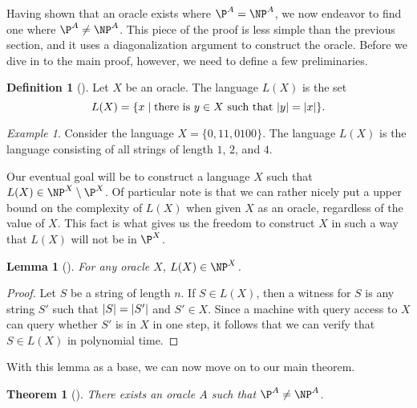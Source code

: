 \documentclass[english,12pt]{reedthesis}
\theoremstyle{plain}
\newtheorem{thm}{Theorem}[section]
\newtheorem{lemma}[lemma]{Lemma}
\theoremstyle{definition}
\newtheorem{defn}[defn]{Definition}
\theoremstyle{remark}
\newtheorem{example}{Example}[thm]
\DeclarePairedDelimiter{\abs}{\lvert}{\rvert}
\begin{document}
Having shown that an oracle exists where $\P^{A} = \NP^{A}$, we now endeavor to
find one where $\P^{A} \ne \NP^{A}$. This piece of the proof is less simple than
the previous section, and it uses a diagonalization argument to construct the
oracle. Before we dive in to the main proof, however, we need to define a few
preliminaries.

\begin{defn}[{\cite[436]{BGS75}}]\label{def:l(x)}
  Let $X$ be an oracle. The language $L(X)$ is the set
  \begin{equation*}
    L(X) = \{x \mid \text{there is } y \in X \text{ such that } \abs{y} = \abs{x}\}.
  \end{equation*}
\end{defn}

\begin{example}\label{ex:l(x)-simple}
  Consider the language $X = \{0, 11, 0100\}$. The language $L(X)$ is the
  language consisting of all strings of length $1$, $2$, and $4$.
\end{example}

Our eventual goal will be to construct a language $X$ such that
$L(X) \in \NP^{X} \setminus \P^{X}$. Of particular note is that we can rather nicely put a
upper bound on the complexity of $L(X)$ when given $X$ as an oracle, regardless
of the value of $X$. This fact is what gives us the freedom to construct $X$ in
such a way that $L(X)$ will not be in $\P^{X}$.

\begin{lemma}[{\cite[436]{BGS75}}]\label{lem:l(x)-in-np}
  For any oracle $X$, $L(X) \in \NP^{X}$.
\end{lemma}

\begin{proof}
  Let $S$ be a string of length $n$. If $S \in L(X)$, then a witness for $S$ is
  any string $S'$ such that $\abs{S} = \abs{S'}$ and $S' \in X$. Since a machine
  with query access to $X$ can query whether $S'$ is in $X$ in one step, it
  follows that we can verify that $S \in L(X)$ in polynomial time.
\end{proof}

With this lemma as a base, we can now move on to our main theorem.

\begin{thm}[{\cite[Theorem 3]{BGS75}}]\label{thm:p-np-nrel}
  There exists an oracle $A$ such that $\P^{A} \ne \NP^{A}$.
\end{thm}
\end{document}
